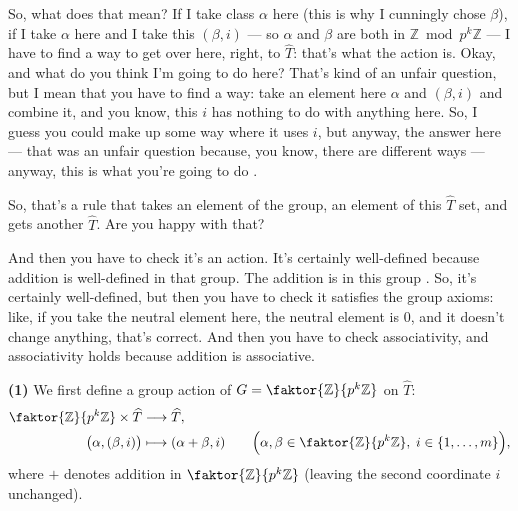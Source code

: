 \begin{proofWrapper}
\begin{speech}[00:33:12 - 00:34:48]
So, what does that mean? If I take class $\alpha$ here (this is why I cunningly chose $\beta$), if I take $\alpha$ here and I take this $(\beta, i)$ --- so $\alpha$ and $\beta$ are both in $\mathbb{Z} \bmod p^k \mathbb{Z}$  --- I have to find a way to get over here, right, to $\widehat{T}$: that's what the action is. Okay, and what do you think I'm going to do here? That's kind of an unfair question, but I mean that you have to find a way: take an element here $\alpha$ and $(\beta, i)$ and combine it, and you know, this $i$ has nothing to do with anything here. So, I guess you could make up some way where it uses $i$, but anyway, the answer here --- that was an unfair question because, you know, there are different ways --- anyway, this is what you're going to do .

So, that's a rule that takes an element of the group, an element of this $\widehat{T}$ set, and gets another $\widehat{T}$. Are you happy with that?

And then you have to check it's an action. It's certainly well-defined because addition is well-defined in that group. The addition is in this group . So, it's certainly well-defined, but then you have to check it satisfies the group axioms: like, if you take the neutral element here, the neutral element is $0$, and it doesn't change anything, that's correct. And then you have to check associativity, and associativity holds because addition is associative.
\end{speech}

\begin{content}
\textbf{(1)} We first define a group action of $G = \faktor{\mathbb{Z}}{p^k\mathbb{Z}}$ on $\widehat{T}$:
\begin{align}
\faktor{\mathbb{Z}}{p^k\mathbb{Z}} \times \widehat{T} &\longrightarrow \widehat{T}, \nonumber \\
\bigl(\alpha, (\beta, i)\bigr) &\longmapsto (\alpha + \beta, i) \qquad \Bigl(\alpha, \beta \in \faktor{\mathbb{Z}}{p^k\mathbb{Z}},\; i \in \{1, \dots, m\}\Bigr), \label{eq:action-on-that}
\end{align}
where $+$ denotes addition in $\faktor{\mathbb{Z}}{p^k\mathbb{Z}}$ (leaving the second coordinate $i$ unchanged).


\end{content}
\end{proofWrapper}
